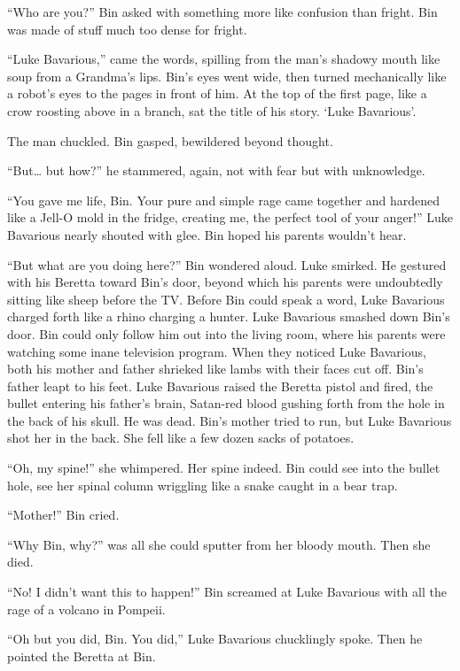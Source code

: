 ``Who are you?'' Bin asked with something more like
confusion than fright. Bin was made of stuff much too dense for
fright.

``Luke Bavarious,'' came the words, spilling from the
man's shadowy mouth like soup from a Grandma's lips.
Bin's eyes went wide, then turned mechanically like a
robot's eyes to the pages in front of him. At the top of the
first page, like a crow roosting above in a branch, sat the title
of his story. `Luke Bavarious'.

The man chuckled. Bin gasped, bewildered beyond thought.

``But{\ldots} but how?'' he stammered, again, not with fear
but with unknowledge.

``You gave me life, Bin. Your pure and simple rage came
together and hardened like a Jell-O mold in the fridge, creating
me, the perfect tool of your anger!'' Luke Bavarious nearly
shouted with glee. Bin hoped his parents wouldn't hear.

``But what are you doing here?'' Bin wondered aloud. Luke
smirked. He gestured with his Beretta toward Bin's door,
beyond which his parents were undoubtedly sitting like sheep before
the TV. Before Bin could speak a word, Luke Bavarious charged forth
like a rhino charging a hunter. Luke Bavarious smashed down
Bin's door. Bin could only follow him out into the living
room, where his parents were watching some inane television
program. When they noticed Luke Bavarious, both his mother and
father shrieked like lambs with their faces cut off. Bin's
father leapt to his feet. Luke Bavarious raised the Beretta pistol
and fired, the bullet entering his father's brain, Satan-red
blood gushing forth from the hole in the back of his skull. He was
dead. Bin's mother tried to run, but Luke Bavarious shot her
in the back. She fell like a few dozen sacks of potatoes.

``Oh, my spine!'' she whimpered. Her spine indeed. Bin
could see into the bullet hole, see her spinal column wriggling
like a snake caught in a bear trap.

``Mother!'' Bin cried.

``Why Bin, why?'' was all she could sputter from her
bloody mouth. Then she died.

``No! I didn't want this to happen!'' Bin screamed
at Luke Bavarious with all the rage of a volcano in Pompeii.

``Oh but you did, Bin. You did,'' Luke Bavarious
chucklingly spoke. Then he pointed the Beretta at Bin.

